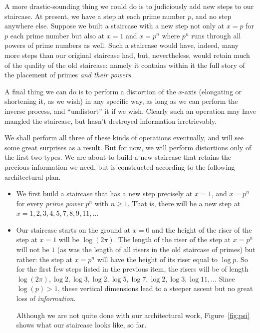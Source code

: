 \documentclass[openany]{book}
\theoremstyle{plain}
\theoremstyle{definition}
\begin{document}
{{A more drastic-sounding thing we could do is to judiciously add new
steps to our staircase. At present, we have a step at each prime
number $p$, and no step anywhere else. Suppose we built a staircase
with a new step not only at $x=p$ for $p$ each prime number but also at
$x =1$ and $x=p^n$ where $p^n$ runs through all powers of prime numbers as
well. Such a staircase would have, indeed, many more steps than our
original staircase had, but, nevertheless, would retain much of the
quality of the old staircase: namely it contains within it the full
story of the placement of primes {\em and their powers}.

A final thing we can do is to perform a distortion of the $x$-axis
(elongating or shortening it, as we wish) in any specific way, as long
as we can perform the inverse process, and ``undistort'' it if we wish.
Clearly such an operation may have mangled the staircase, but hasn't destroyed
information irretrievably.

We shall perform all three of these kinds of operations eventually,
and will see some great surprises as a result.  But for now, we will
perform distortions only of the first two types.  We are about to
build a new staircase that retains the precious information we need,
but is constructed according to the following architectural plan.

 \begin{itemize}

 \item We first build a staircase that has a new step precisely at $x
   =1$, and $ x= p^n$ for every {\em prime power} $p^n$ with $n\geq
   1$. That is, there will be a new step at $x= 1,2,3,4,5,7,8,9,11,
   \dots$

 \item Our staircase starts on the ground at $x=0$ and the height of the
   riser of the step at $x=1$ will be $\log(2\pi)$. The length of the
   riser of the step at $x=p^n$ will not be $1$
   (as was the length of all risers in the old staircase of primes)
   but rather: the step at $x=p^n$ will have the height of its riser
   equal to $\log p$.  So for the first few steps listed in the
   previous item, the risers will be of length $\log(2\pi), \log
   2,\log 3,\log 2,\log 5,\log 7, \log 2,\log 3,\log 11, \dots$
   Since $\log(p)>1$,
  these vertical dimensions lead to a steeper ascent but no great loss
  of {\em information}.

   Although we are not quite done with our architectural work, Figure~\ref{fig:psi} shows
   what our staircase looks like, so far.


\end{itemize}}}
\end{document}
